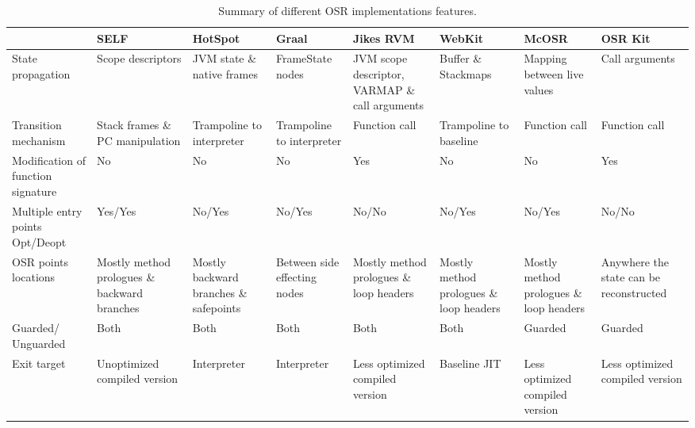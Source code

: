 \clearpage

\begin{landscape}
\begin{table}[h!]
\centering
\begin{tabular}{|p{}|
                 p{}|
                 p{}|
                 p{}|
                 p{}|
                 p{}|
                 p{}|
                 p{}|}
\hline
& SELF & HotSpot & Graal & Jikes RVM & WebKit & McOSR & OSR Kit \\ \hline
State propagation & Scope descriptors & JVM state \& native frames & FrameState nodes & JVM scope descriptor, VARMAP \& call arguments & Buffer \& Stackmaps & Mapping between live values & Call arguments \\ \hline
Transition mechanism & Stack frames \& PC manipulation & Trampoline to interpreter & Trampoline to interpreter & Function call & Trampoline to baseline & Function call & Function call \\ \hline
Modification of function signature & No & No & No & Yes & No & No & Yes \\ \hline
Multiple \shortstack{entry points \\ Opt/Deopt} & Yes/Yes & No/Yes & No/Yes & No/No & No/Yes & No/Yes & No/No \\ \hline
OSR points locations & Mostly method prologues \& backward branches & Mostly backward branches \& safepoints & Between side effecting nodes & Mostly method prologues \& loop headers & Mostly method prologues \& loop headers & Mostly method prologues \& loop headers & Anywhere the state can be reconstructed \\ \hline
Guarded/ Unguarded & Both & Both & Both & Both & Both & Guarded & Guarded \\ \hline
Exit target & Unoptimized compiled version & Interpreter & Interpreter & Less optimized compiled version & Baseline JIT & Less optimized compiled version & Less optimized compiled version \\ \hline
\end{tabular}
\caption{Summary of different OSR implementations features.}
\label{tab:Summary}
\end{table}
\end{landscape}
\clearpage